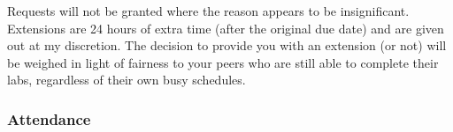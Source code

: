 \documentclass[11pt]{article} %
\begin{document}
Requests will not be granted where the reason appears to be insignificant. Extensions are 24 hours of extra time (after the original due date) and are given out at my discretion. The decision to provide you with an extension (or not) will be weighed in light of fairness to your peers who are still able to complete their labs, regardless of their own busy schedules.





\subsubsection*{\textbf{Attendance}}
\end{document}
